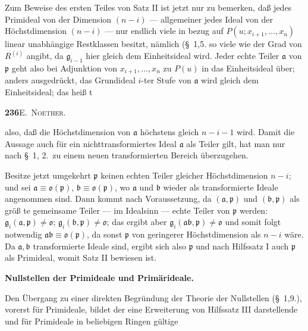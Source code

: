 \documentclass[12pt,a4paper]{article}
\begin{document}
{{Zum Beweise des ersten Teiles von Satz II ist jetzt nur zu bemerken,
da{\ss} jedes Primideal von der Dimension $(n-i)$ --- allgemeiner jedes Ideal
von der H\"{o}chstdimension $(n-i)$ --- nur endlich viele in bezug auf
$P(u;x_{i+1},\dots,x_{n})$ linear unabh\"{a}ngige Restklassen besitzt, n\"{a}mlich (\S~1,5.
so viele wie der Grad von $R^{(i)}$ angibt, da $\mathfrak{g}_{i-1}$ hier gleich dem Einheitsideal
wird. Jeder echte Teiler $\mathfrak{a}$ von $\mathfrak{p}$ geht also bei Adjunktion von
$x_{i+1},\dots,x_{n}$ zu $P(u)$ in das Einheitsideal \"{u}ber; anders ausgedr\"{u}ckt, das
Grundideal $i$-ter Stufe von $\mathfrak{a}$ wird gleich dem Einheitsideal; das hei{\ss} t

\newpage
\begin{center}
\textbf{236}\quad\textsc{E.~Noether.}
\end{center}

also, da{\ss} die H\"{o}chstdimension von $\mathfrak{a}$ h\"{o}chstens gleich $n-i-1$ wird. Damit
die Aussage auch f\"{u}r ein nichttransformiertes Ideal $\mathfrak{a}$ als Teiler gilt, hat
man nur nach \S~1, 2.\ zu einem neuen transformierten Bereich \"{u}berzugehen.

Besitze jetzt umgekehrt $\mathfrak{p}$ keinen echten Teiler gleicher H\"{o}chstdimension
$n-i$; und sei $\mathfrak{a}\equiv\mathfrak{o}(\mathfrak{p})$, $\mathfrak{b}\equiv\mathfrak{o}(\mathfrak{p})$, wo $\mathfrak{a}$ und $\mathfrak{b}$ wieder als transformierte
Ideale angenommen sind. Dann kommt nach Voraussetzung, da $(\mathfrak{a},\mathfrak{p})$
und $(\mathfrak{b},\mathfrak{p})$ als gr\"{o}{\ss} te gemeinsame Teiler --- im Idealsinn --- echte Teiler
von $\mathfrak{p}$ werden: $\mathfrak{g}_{i}(\mathfrak{a},\mathfrak{p})\neq\mathfrak{o}$; $\mathfrak{g}_{i}(\mathfrak{b},\mathfrak{p})\neq\mathfrak{o}$;
das ergibt aber $\mathfrak{g}_{i}(\mathfrak{a}\mathfrak{b},\mathfrak{p})\neq\mathfrak{o}$
und somit folgt notwendig $\mathfrak{a}\mathfrak{b}\equiv\mathfrak{o}(\mathfrak{p})$, da sonst $\mathfrak{p}$ von geringerer H\"{o}chstdimension
als $n-i$ w\"{a}re. Da $\mathfrak{a},\mathfrak{b}$ transformierte Ideale sind, ergibt sich also
$\mathfrak{p}$ und nach Hilfssatz I auch $\mathfrak{p}$ als Primideal, womit Satz II bewiesen ist.

\medskip
\noindent\textbf{Nullstellen der Primideale und Prim\"{a}rideale.}

Den \"{U}bergang zu einer direkten Begr\"{u}ndung der Theorie der Nullstellen
(\S~1,9.), vorerst f\"{u}r Primideale, bildet der eine Erweiterung von
Hilfssatz III darstellende und f\"{u}r Primideale in beliebigen Ringen g\"{u}ltige

}}
\end{document}
